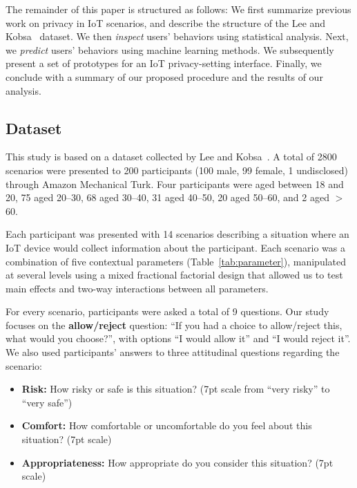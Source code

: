 The remainder of this paper is structured as follows: We first summarize previous work on privacy in IoT scenarios, and describe the structure of the Lee and Kobsa~\cite{lee2016understanding} dataset. We then \emph{inspect} users' behaviors using statistical analysis. Next, we \emph{predict} users' behaviors using machine learning methods. We subsequently present a set of prototypes for an IoT privacy-setting interface. Finally, we conclude with a summary of our proposed procedure and the results of our analysis.

\subsection{Dataset}
This study is based on a dataset collected by Lee and Kobsa~\cite{lee2016understanding}. A total of 2800 scenarios were presented to 200 participants (100 male, 99 female, 1 undisclosed) through Amazon Mechanical Turk. Four participants were aged between 18 and 20, 75 aged 20--30, 68 aged 30--40, 31 aged 40--50, 20 aged 50--60, and 2 aged $>$ 60. 

Each participant was presented with 14 scenarios describing a situation where an IoT device would collect information about the participant. Each scenario was a combination of five contextual parameters (Table~\ref{tab:parameter}), manipulated at several levels using a mixed fractional factorial design that allowed us to test main effects and two-way interactions between all parameters.

For every scenario, participants were asked a total of 9 questions. Our study focuses on the \textbf{allow/reject} question: ``If you had a choice to allow/reject this, what would you choose?'', with options ``I would allow it'' and ``I would reject it''. We also used participants' answers to three attitudinal questions regarding the scenario:
\begin{itemize}
	\item \textbf{Risk:} How risky or safe is this situation? (7pt scale from ``very risky'' to ``very safe'')
	\item \textbf{Comfort:} How comfortable or uncomfortable do you feel about this situation? (7pt scale)
	\item \textbf{Appropriateness:} How appropriate do you consider this situation? (7pt scale)
\end{itemize}

